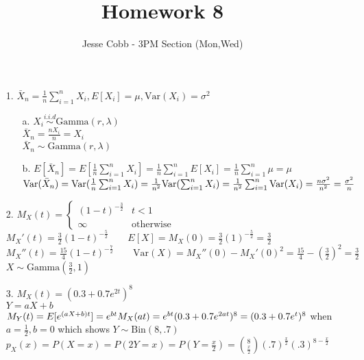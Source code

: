 \documentclass[11pt]{amsart}
\theoremstyle{definition}
\begin{document}
\title{Homework 8}

\author{Jesse Cobb - 3PM Section (Mon,Wed)}

\maketitle

\begin{itemize}

\item[1.] $\bar X_n=\frac 1n\sum_{i=1}^n X_i,E[X_i]=\mu,\text{Var}(X_i)=\sigma^2$
\begin{itemize}
    \item[a.] $X_i\stackrel{i.i.d}\sim \text{Gamma}(r,\lambda)$ \\
              $\bar X_n=\frac{nX_i}{n}=X_i$ \\
              $\bar X_n\sim \text{Gamma}(r,\lambda)$

    \item[b.] $E[\bar X_n]=E[\frac 1n\sum_{i=1}^n X_i]=\frac 1n\sum_{i=1}^n E[X_i]=\frac 1n\sum_{i=1}^n \mu=\mu$ \\
              $\text{Var}(\bar X_n)=\text{Var}(\frac 1n\sum_{i=1}^n X_i)=\frac 1{n^2}\text{Var}(\sum_{i=1}^n X_i)\\
              =\frac 1{n^2}\sum_{i=1}^n\text{Var}(X_i)=\frac{n\sigma^2}{n^2}=\frac{\sigma^2}n$
    
\end{itemize}

\item[2.] $M_X(t)=\begin{cases}
    (1-t)^{-\frac32} &t<1 \\
    \infty &\text{otherwise}
\end{cases}$\\
$M_X'(t)=\frac32(1-t)^{-\frac52}\qquad
E[X]=M_X(0)=\frac32(1)^{-\frac52}=\frac32$ \\
$M_X''(t)=\frac{15}4(1-t)^{-\frac72}\qquad
\text{Var}(X)=M_X''(0)-M_X'(0)^2=\frac{15}4-(\frac32)^2=\frac32$\\
$X\sim\text{Gamma}(\frac32,1)$

\item[3.] $M_X(t)=(0.3+0.7e^{2t})^8$ \\
          $Y=aX+b$ \\
          $M_Y(t)=E[e^{(aX+b)t}]=e^{bt}M_X(at)=e^{bt}(0.3+0.7e^{2at})^8\\
          =(0.3+0.7e^{t})^8$ when $a=\frac12,b=0$ which shows $Y\sim\text{Bin}(8,.7)$ \\
          $p_X(x)=P(X=x)=P(2Y=x)=P(Y=\frac x2)=\binom{8}{\frac x2}(.7)^\frac x2(.3)^{8-\frac x2}$


\end{itemize}
\end{document}
